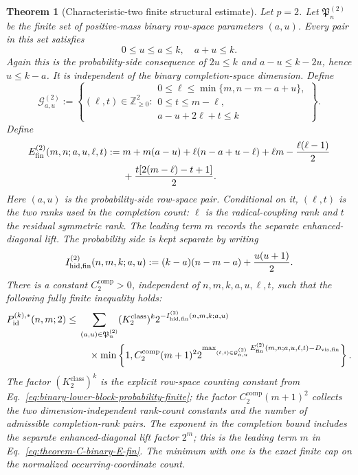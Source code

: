 \documentclass[11pt]{article}
\newcommand{\1}{\mathbf 1}
\theoremstyle{plain}
\newtheorem{theorem}{Theorem}[section]
\theoremstyle{definition}
\theoremstyle{remark}
\begin{document}
\begin{theorem}[Characteristic-two finite structural estimate]
\label{thm:converse-binary-finite-structural-estimate}
Let $p=2$.  Let $\mathfrak P_n^{(2)}$ be the finite set of positive-mass binary
row-space parameters $(a,u)$.  Every pair in this set satisfies
\begin{equation}
 0\le u\le a\le k,\quad a+u\le k.
 \label{eq:theorem-C-positive-mass-domain}
\end{equation}
Again this is the probability-side consequence of $2u\le k$ and
$a-u\le k-2u$, hence $u\le k-a$.  It is independent of the binary
completion-space dimension.  Define
\begin{equation}
 \mathcal G_{a,u}^{(2)}
 :=\left\{(\ell,t)\in\mathbb Z_{\ge0}^2:
 \begin{array}{l}
 0\le\ell\le\min\{m,n-m-a+u\},\\
 0\le t\le m-\ell,\\
 a-u+2\ell+t\le k
 \end{array}\right\}.
 \label{eq:main-binary-completion-ranges}
\end{equation}
Define
\begin{align}
 E_{\rm fin}^{(2)}(m,n;a,u,\ell,t)
 :={}&m+m(a-u)+\ell(n-a+u-\ell)
 +\ell m-\frac{\ell(\ell-1)}2\notag\\
 &+\frac{t[2(m-\ell)-t+1]}2.
 \label{eq:theorem-C-binary-E-fin}
\end{align}
Here $(a,u)$ is the probability-side row-space pair.  Conditional on it,
$(\ell,t)$ is the two ranks used in the completion count: $\ell$ is the radical-coupling rank
and $t$ the residual symmetric rank.  The leading term $m$ records the
separate enhanced-diagonal lift.  The probability side is kept separate by
writing
\begin{equation}
 I_{\rm hid,fin}^{(2)}(n,m,k;a,u)
 :=(k-a)(n-m-a)+\frac{u(u+1)}2.
 \label{eq:theorem-C-binary-hidden-exponent}
\end{equation}
There is a constant $C_2^{\mathrm{comp}}>0$, independent of
$n,m,k,a,u,\ell,t$, such that the following fully finite inequality holds:
\begin{align}
 P_{\mathrm{id}}^{(k),*}(n,m;2)
 \le{}&\sum_{(a,u)\in\mathfrak P_n^{(2)}}
 (K_2^{\mathrm{class}})^k
 2^{-I_{\rm hid,fin}^{(2)}(n,m,k;a,u)}\notag\\
 &\quad\times
 \min\left\{1,
 C_2^{\mathrm{comp}}(m+1)^2
 2^{\max_{(\ell,t)\in\mathcal G_{a,u}^{(2)}}
 E_{\rm fin}^{(2)}(m,n;a,u,\ell,t)
 -D_{\rm vis,fin}}\right\}.
 \label{eq:main-binary-finite-exponent-bound}
\end{align}
The factor $(K_2^{\mathrm{class}})^k$ is the explicit row-space counting
constant from Eq.~\eqref{eq:binary-lower-block-probability-finite}; the factor
$C_2^{\mathrm{comp}}(m+1)^2$ collects the two dimension-independent rank-count
constants and the number of admissible completion-rank pairs.  The exponent in
the completion bound includes the separate enhanced-diagonal lift factor
$2^m$; this is the leading term $m$ in
Eq.~\eqref{eq:theorem-C-binary-E-fin}.  The minimum with one is the exact
finite cap on the normalized occurring-coordinate count.


\end{theorem}
\end{document}
